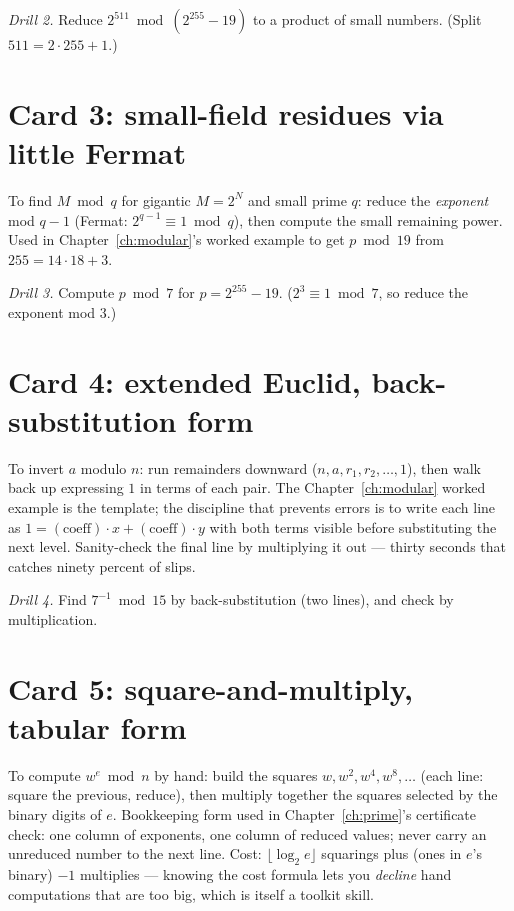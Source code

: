 \emph{Drill 2.} Reduce $2^{511} \bmod (2^{255} - 19)$ to a product of
small numbers. (Split $511 = 2 \cdot 255 + 1$.)

\section{Card 3: small-field residues via little Fermat}

To find $M \bmod q$ for gigantic $M = 2^{N}$ and small prime $q$: reduce
the \emph{exponent} mod $q - 1$ (Fermat: $2^{q-1} \equiv 1 \bmod q$),
then compute the small remaining power. Used in
Chapter~\ref{ch:modular}'s worked example to get
$p \bmod 19$ from $255 = 14 \cdot 18 + 3$.

\emph{Drill 3.} Compute $p \bmod 7$ for $p = 2^{255} - 19$. ($2^3 \equiv
1 \bmod 7$, so reduce the exponent mod $3$.)

\section{Card 4: extended Euclid, back-substitution form}

To invert $a$ modulo $n$: run remainders downward
($n, a, r_1, r_2, \dots, 1$), then walk back up expressing $1$ in terms
of each pair. The Chapter~\ref{ch:modular} worked example is the
template; the discipline that prevents errors is to write each line as
$1 = (\text{coeff}) \cdot x + (\text{coeff}) \cdot y$ with both terms
visible before substituting the next level. Sanity-check the final line
by multiplying it out --- thirty seconds that catches ninety percent of
slips.

\emph{Drill 4.} Find $7^{-1} \bmod 15$ by back-substitution (two lines),
and check by multiplication.

\section{Card 5: square-and-multiply, tabular form}

To compute $w^{e} \bmod n$ by hand: build the squares
$w, w^2, w^4, w^8, \dots$ (each line: square the previous, reduce),
then multiply together the squares selected by the binary digits of $e$.
Bookkeeping form used in Chapter~\ref{ch:prime}'s certificate check:
one column of exponents, one column of reduced values; never carry an
unreduced number to the next line. Cost: $\lfloor \log_2 e \rfloor$
squarings plus (ones in $e$'s binary) $- 1$ multiplies --- knowing the
cost formula lets you \emph{decline} hand computations that are too big,
which is itself a toolkit skill.

